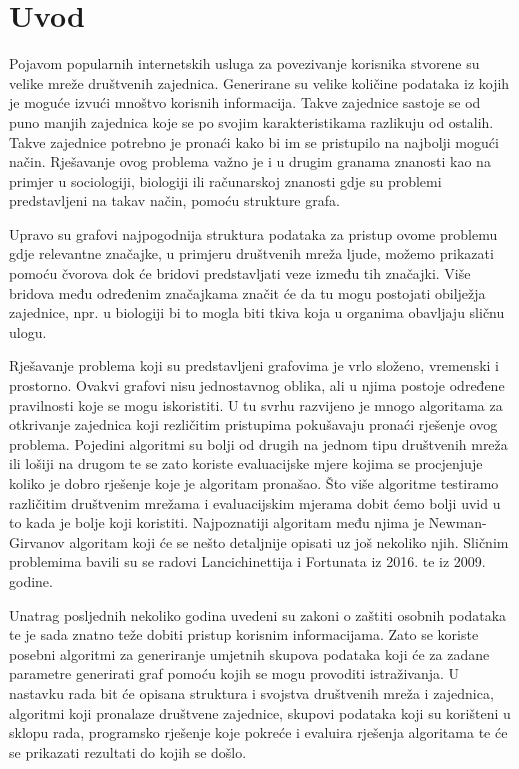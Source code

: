 \chapter{Uvod}

Pojavom popularnih internetskih usluga za povezivanje korisnika stvorene su velike mreže društvenih zajednica. Generirane su velike količine podataka iz kojih je moguće izvući mnoštvo korisnih informacija. Takve zajednice sastoje se od puno manjih zajednica koje se po svojim karakteristikama razlikuju od ostalih. Takve zajednice potrebno je pronaći kako bi im se pristupilo na najbolji mogući način. Rješavanje ovog problema važno je i u drugim granama znanosti kao na primjer u sociologiji, biologiji ili računarskoj znanosti gdje su problemi predstavljeni na takav način, pomoću strukture grafa. 

Upravo su grafovi najpogodnija struktura podataka za pristup ovome problemu gdje relevantne značajke, u primjeru društvenih mreža ljude, možemo prikazati pomoću čvorova dok će bridovi predstavljati veze između tih značajki. Više bridova među određenim značajkama značit će da tu mogu postojati obilježja zajednice, npr. u biologiji bi to mogla biti tkiva koja u organima obavljaju sličnu ulogu. 

Rješavanje problema koji su predstavljeni grafovima je vrlo složeno, vremenski i prostorno. Ovakvi grafovi nisu jednostavnog oblika, ali u njima postoje određene pravilnosti koje se mogu iskoristiti. U tu svrhu razvijeno je mnogo algoritama za otkrivanje zajednica koji rezličitim pristupima pokušavaju pronaći rješenje ovog problema. Pojedini algoritmi su bolji od drugih na jednom tipu društvenih mreža ili lošiji na drugom te se zato koriste evaluacijske mjere kojima se procjenjuje koliko je dobro rješenje koje je algoritam pronašao. Što više algoritme testiramo različitim društvenim mrežama i evaluacijskim mjerama dobit ćemo bolji uvid u to kada je bolje koji koristiti. Najpoznatiji algoritam među njima je Newman-Girvanov algoritam koji će se nešto detaljnije opisati uz još nekoliko njih. Sličnim problemima bavili su se radovi Lancichinettija i Fortunata \cite{fortunato2016community} iz 2016. te \cite{lancichinetti2009community} iz 2009. godine.

Unatrag posljednih nekoliko godina uvedeni su zakoni o zaštiti osobnih podataka te je sada znatno teže dobiti pristup korisnim informacijama. Zato se koriste posebni algoritmi za generiranje umjetnih skupova podataka koji će za zadane parametre generirati graf pomoću kojih se mogu provoditi istraživanja. U nastavku rada bit će opisana struktura i svojstva društvenih mreža i zajednica, algoritmi koji pronalaze društvene zajednice, skupovi podataka koji su korišteni u sklopu rada, programsko rješenje koje pokreće i evaluira rješenja algoritama te će se prikazati rezultati do kojih se došlo. 


